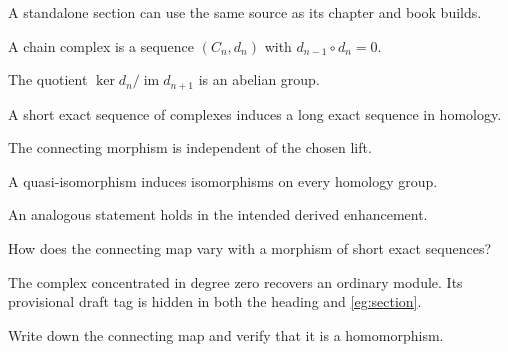\documentclass[sectionlevel=section,status=draft]{noteformyself}
\begin{document}
\begin{mainthm}[
  title={Standalone coherence},
  label=\labelNFM{mainthm:section}
]
  A standalone section can use the same source as its chapter and book builds.
\end{mainthm}

\begin{definition}[label=\labelNFM{def:section-draft}]
  A chain complex is a sequence \((C_n,d_n)\) with
  \(d_{n-1}\circ d_n=0\).
\end{definition}

\begin{proposition}[
  title={Cycles modulo boundaries},
  label=\labelNFM{prop:section}
]
  The quotient \(\ker d_n/\operatorname{im}d_{n+1}\) is an abelian group.
\end{proposition}

\begin{theorem}[label=\labelNFM{thm:section}]
  A short exact sequence of complexes induces a long exact sequence in
  homology.
\end{theorem}

\begin{lemma}[
  title={Connecting map},
  label=\labelNFM{lem:section}
]
  The connecting morphism is independent of the chosen lift.
\end{lemma}

\begin{corollary}[label=\labelNFM{cor:section}]
  A quasi-isomorphism induces isomorphisms on every homology group.
\end{corollary}

\begin{conjecture}[label=\labelNFM{conj:section}]
  An analogous statement holds in the intended derived enhancement.
\end{conjecture}

\begin{question}[
  title={Naturality},
  label=\labelNFM{ques:section}
]
  How does the connecting map vary with a morphism of short exact sequences?
\end{question}

\begin{example}[tag=0SE0202,label=\labelNFM{eg:section}]
  The complex concentrated in degree zero recovers an ordinary module. Its
  provisional draft tag is hidden in both the heading and \cref{eg:section}.
\end{example}

\begin{exercise}[label=\labelNFM{ex:section}]
  Write down the connecting map and verify that it is a homomorphism.
\end{exercise}
\end{document}
